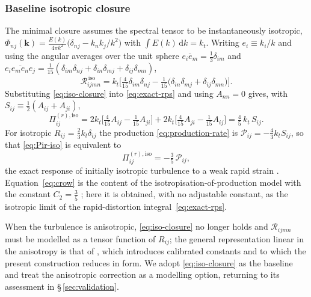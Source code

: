 \documentclass[lineno]{JFM-FLM_Au}
\begin{document}
\subsubsection{Baseline isotropic closure}

The minimal closure assumes the spectral tensor to be instantaneously
isotropic,
$\Phi_{nj}(\boldsymbol{k})=\frac{E(k)}{4\pi k^2}\big(\delta_{nj}
-k_nk_j/k^2\big)$ with $\int E(k)\,\mathrm{d}k=k_t$. Writing
$e_i\equiv k_i/k$ and using the angular averages over the unit sphere
$\overline{e_i e_m}=\tfrac13\delta_{im}$ and
$\overline{e_i e_m e_n e_j}=\tfrac1{15}(\delta_{im}\delta_{nj}
+\delta_{in}\delta_{mj}+\delta_{ij}\delta_{mn})$,
\begin{equation}
  \mathcal{R}_{ijmn}^{\,\mathrm{iso}}
  = k_t\Big[\tfrac{4}{15}\delta_{im}\delta_{nj}
    -\tfrac1{15}\big(\delta_{in}\delta_{mj}+\delta_{ij}\delta_{mn}\big)\Big].
  \label{eq:iso-closure}
\end{equation}
Substituting \eqref{eq:iso-closure} into \eqref{eq:exact-rps} and using
$A_{nn}=0$ gives, with $S_{ij}\equiv\tfrac12(A_{ij}+A_{ji})$,
\begin{equation}
  \Pi_{ij}^{(r),\mathrm{iso}}
  = 2k_t\Big[\tfrac{4}{15}A_{ij}-\tfrac1{15}A_{ji}\Big]
   +2k_t\Big[\tfrac{4}{15}A_{ji}-\tfrac1{15}A_{ij}\Big]
  = \tfrac{4}{5}\,k_t\,S_{ij}.
  \label{eq:Pir-iso}
\end{equation}
For isotropic $R_{ij}=\tfrac23 k_t\delta_{ij}$ the production
\eqref{eq:production-rate} is $\mathcal{P}_{ij}=-\tfrac43 k_t S_{ij}$, so
that \eqref{eq:Pir-iso} is equivalent to
\begin{equation}
  \Pi_{ij}^{(r),\mathrm{iso}} = -\tfrac{3}{5}\,\mathcal{P}_{ij},
  \label{eq:crow}
\end{equation}
the exact response of initially isotropic turbulence to a weak rapid strain
\citep{Crow1968}. Equation~\eqref{eq:crow} is the content of the
isotropisation-of-production model with the constant $C_2=\tfrac35$
\citep{Pope2000}; here it is obtained, with no adjustable constant, as the
isotropic limit of the rapid-distortion integral~\eqref{eq:exact-rps}.

When the turbulence is anisotropic, \eqref{eq:iso-closure} no longer holds
and $\mathcal{R}_{ijmn}$ must be modelled as a tensor function of $R_{ij}$;
the general representation linear in the anisotropy is that of
\citet{LaunderReeceRodi1975}, which introduces calibrated constants and to
which the present construction reduces in form. We adopt
\eqref{eq:iso-closure} as the baseline and treat the anisotropic
correction as a modelling option, returning to its assessment in
\S\,\ref{sec:validation}.
\end{document}
